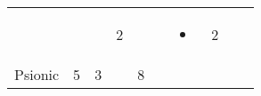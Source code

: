 \documentclass[12pt]{article}
\begin{document}
\begin{longtable}[]{@{}llllllllll@{}}
\begin{minipage}[t]{0.06\columnwidth}\raggedright\strut
\strut\end{minipage} &
\begin{minipage}[t]{0.06\columnwidth}\raggedright\strut
\strut\end{minipage} &
\begin{minipage}[t]{0.06\columnwidth}\raggedright\strut
\strut\end{minipage} &
\begin{minipage}[t]{0.06\columnwidth}\raggedright\strut
2
\strut\end{minipage} &
\begin{minipage}[t]{0.06\columnwidth}\raggedright\strut
\strut\end{minipage} &
\begin{minipage}[t]{0.06\columnwidth}\raggedright\strut
\strut\end{minipage} &
\begin{minipage}[t]{0.07\columnwidth}\raggedright\strut
\begin{itemize}
\item
\end{itemize}
\strut\end{minipage} &
\begin{minipage}[t]{0.08\columnwidth}\raggedright\strut
2
\strut\end{minipage}\tabularnewline
\begin{minipage}[t]{0.13\columnwidth}\raggedright\strut
Psionic
\strut\end{minipage} &
\begin{minipage}[t]{0.06\columnwidth}\raggedright\strut
5
\strut\end{minipage} &
\begin{minipage}[t]{0.06\columnwidth}\raggedright\strut
3
\strut\end{minipage} &
\begin{minipage}[t]{0.06\columnwidth}\raggedright\strut
\strut\end{minipage} &
\begin{minipage}[t]{0.06\columnwidth}\raggedright\strut
8
\strut\end{minipage} &
\begin{minipage}[t]{0.06\columnwidth}\raggedright\strut
\strut\end{minipage} &
\begin{minipage}[t]{0.06\columnwidth}\raggedright\strut
\strut\end{minipage} &
\begin{minipage}[t]{0.06\columnwidth}\raggedright\strut

\end{minipage}
\end{longtable}
\end{document}
